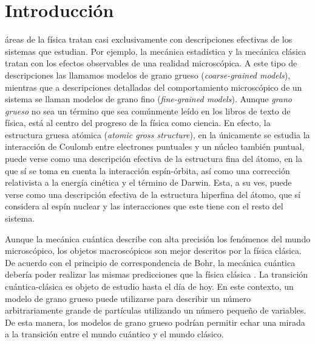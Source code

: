 \chapter{Introducción}



 áreas de la física tratan casi exclusivamente con descripciones efectivas de los sistemas que estudian. Por ejemplo, la mecánica estadística y la mecánica clásica tratan con los efectos observables de una realidad microscópica.  A este tipo de descripciones las llamamos modelos de grano grueso (\textit{coarse-grained models}), mientras que a descripciones detalladas del comportamiento microscópico de un sistema se llaman modelos de grano fino (\textit{fine-grained models}). Aunque \textit{grano grueso} no sea un término que sea comúnmente leído en los libros de texto de física, está al centro del progreso de la física como ciencia. En efecto, la estructura gruesa atómica (\textit{atomic gross structure}), en la  únicamente se estudia la interacción de Coulomb entre electrones puntuales y un núcleo también puntual, puede verse como una descripción efectiva de la estructura fina del átomo, en la que sí se toma en cuenta la interacción espín-órbita, así como una corrección relativista a la energía cinética y el término de Darwin. Esta, a su ves, puede verse como una descripción efectiva de la estructura hiperfina del átomo, que sí considera al espín nuclear y las interacciones que este tiene con el resto del sistema.


Aunque la mecánica cuántica describe con alta precisión los fenómenos del mundo microscópico, los objetos macroscópicos son mejor descritos por la física clásica. De acuerdo con el principio de correspondencia de Bohr, la mecánica cuántica debería poder realizar las mismas predicciones que la física clásica . La transición cuántica-clásica es objeto de estudio hasta el día de hoy. En este contexto, un modelo de grano grueso puede utilizarse para describir un número arbitrariamente grande de partículas utilizando un número pequeño de variables. De esta manera, los modelos de grano grueso podrían permitir echar una mirada a la transición entre el mundo cuántico y el mundo clásico.


